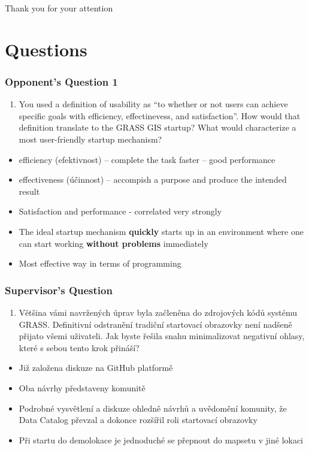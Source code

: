 \documentclass[aspectratio=169]{beamer}
\begin{document}
\begin{frame}
\begin{center}
{\fontsize{20}{40}\selectfont Thank you for your attention}
\end{center}
\end{frame}

\section{Questions}

\begin{frame}
\frametitle{Opponent's Question 1}
\begin{enumerate}
\item{You used a definition of usability as ``to whether or not users can achieve specific goals with efficiency, effectinevess, and satisfaction''. How would that definition translate to the GRASS GIS startup? What would characterize a most user-friendly startup mechanism?}
\end{enumerate}
\begin{itemize}
\vspace{0.3cm}
\item{efficiency (efektivnost) -- complete the task faster -- good performance}
\item{effectiveness (účinnost) -- accompish a purpose and produce the intended result}
\item{Satisfaction and performance - correlated very strongly}
\item{The ideal startup mechanism \textbf{quickly} starts up in an environment where one can start working \textbf{without problems} immediately}
\item{Most effective way in terms of programming}
\end{itemize}
\end{frame}

\begin{frame}
\frametitle{Supervisor's Question}
\begin{enumerate}
\item{Většina vámi navržených úprav byla začleněna do zdrojových kódů systému GRASS. Definitivní odstranění tradiční startovací obrazovky není nadšeně přijato všemi uživateli. Jak byste řešila snahu minimalizovat negativní ohlasy, které s sebou tento krok přináší?}
\end{enumerate}
\begin{itemize}
\vspace{0.3cm}
\item{Již založena diskuze na GitHub platformě}
\item{Oba návrhy představeny komunitě}
\item{Podrobné vysvětlení a diskuze ohledně návrhů a uvědomění komunity, že Data Catalog převzal a dokonce rozšířil roli startovací obrazovky}
\item{Při startu do demolokace je jednoduché se přepnout do mapsetu v jiné lokaci}
\end{itemize}
\end{frame}
\end{document}
